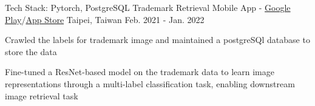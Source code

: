 

\begin{cventries}



  \cventry
    {\color{awesome} Tech Stack: Pytorch, PostgreSQL} %
    {Trademark Retrieval Mobile App - \color{awesome}\href{https://play.google.com/store/apps/details?id=meow.logoshot&hl=zh_TW&gl=TW&pli=1}{Google Play}/\href{https://apps.apple.com/tw/app/logo-shot/id1611756574}{App Store}}
    {Taipei, Taiwan} %
    {Feb. 2021 - Jan. 2022} %
    {
      \begin{cvitems} %
        \item {Crawled the labels for trademark image and maintained a postgreSQl database to store the data}
        \item {Fine-tuned a ResNet-based model on the trademark data to learn image representations through a multi-label classification task, enabling downstream image retrieval task}
      \end{cvitems}
    }


\end{cventries}
